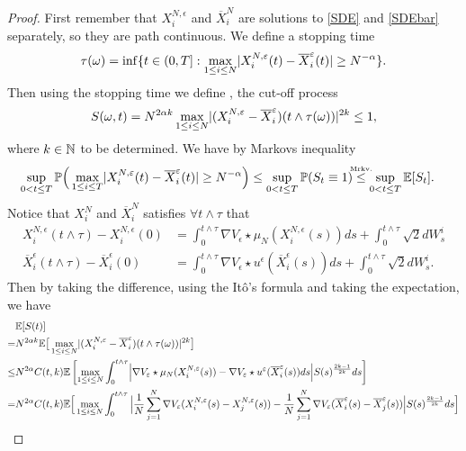 \begin{proof}
  First remember that $X_i^{N,\epsilon} $ and $\overline{X}^{N}_i  $ are solutions to \autoref{SDE} and \autoref{SDEbar} separately, so they are path continuous. 
 We define a stopping time 
 \begin{align*}
   \tau(\omega )  = \inf  \{t \in  (0,T] : \max_{1\leq i\leq N} \lvert X^{N,\varepsilon}_i(t) - \overline{X}_i^{\varepsilon}(t)\rvert \ge  N^{-\alpha}  \}    
 .\end{align*}
Then using the stopping time we define , the cut-off process 
\begin{align*}
  S(\omega,t) =  N^{2\alpha k } \max_{1\leq i\leq N} \lvert(X^{N,\varepsilon}_i - \overline{X}_i^{\varepsilon})(t \land \tau(\omega))\rvert^{2k}  \le  1
,\end{align*}
where $k\in \mathbb{N}$ to be determined.
 We have by Markovs inequality  
 \begin{align*}
   \sup_{0 < t \le  T} \P\Big( \max_{1\leq i\leq T} \abs{X^{N,\epsilon}_i(t) - \overline{X}_i^{\epsilon}(t)   } \ge N^{-\alpha } \Big) &\le  \sup_{0 < t \le T} \P(S_t \equiv 1)\myS{Mrkv.}{\le } \sup_{0 < t \le T} \E[S_t] 
 .\end{align*}
Notice that $X_i^N$ and $\overline{X}_i^N$ satisfies $\forall t\land\tau$ that
\begin{align*}
  X_i^{N,\epsilon} (t \land \tau ) - X_i^{N,\epsilon} (0) &= \int_0^{t \land \tau }  \nabla V_{\epsilon} \star  \mu_N(X_i^{N,\epsilon}(s) ) ds + \int_0^{t \land \tau }  \sqrt{2} dW_s^{i}  \\
  \overline{X}_i^{\epsilon} (t \land \tau ) - \overline{X}_i^{\epsilon} (0) &= \int_0^{t \land \tau }  \nabla V_{\epsilon} \star  u^{\epsilon}(\overline{X}_i^{\epsilon}(s) ) ds + \int_0^{t \land \tau }  \sqrt{2} dW_s^{i}  
.\end{align*}
Then  by taking the difference, using the It\^o's formula and taking the expectation, we have
\begin{align*}
  &\E[S(t)] \\
  =& N^{2\alpha k } \E\big[\max_{1\leq i\leq N} \abs{(X^{N,\epsilon}_i - \overline{X}_i^{\epsilon})(t \land \tau(\omega))}^{2k}\big] \\
           \le &  N^{2 \alpha } C(t,k)  \E\left[ \max_{1\leq i\leq N}\int_0^{t \land \tau }  \abs*{\nabla V_{\epsilon} \star  \mu_N(X_i^{N,\epsilon}(s) ) -  \nabla V_{\epsilon} \star  u^{\epsilon}(\overline{X}_i^{\epsilon}(s) )ds} S(s)^{\frac{2k-1}{2k}} ds \right]\\
           = &N^{2 \alpha }  C(t,k)  \E\Big[ \max_{1\leq i\leq N}\int_0^{t \land \tau }  \Big|\frac{1}{N} \sum_{j=1}^N \nabla V_{\epsilon}(X_i^{N,\epsilon}(s) - X^{N,\epsilon}_{j}(s)  ) - \frac{1}{N} \sum_{j=1}^N \nabla V_{\epsilon}(\overline{X}_i^{\epsilon}(s) - \overline{X}_j^{\epsilon}(s) ) \Big|S(s)^{\frac{2k-1}{2k}} ds  \Big]\\

\end{align*}
\end{proof}
